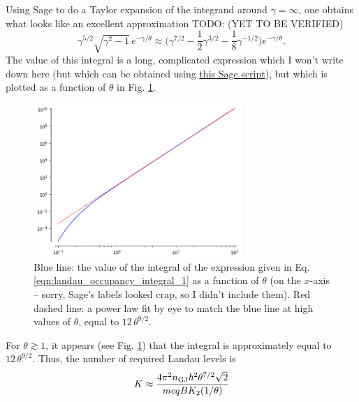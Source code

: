 \documentclass{book}
\newcommand{\todo}[1]{{\color{red}TODO: {#1}}}
\newcommand{\nGJ}{n_{\rm GJ}}
\begin{document}
Using Sage to do a Taylor expansion of the integrand around $\gamma = \infty$, one obtains what looks like an excellent approximation \todo{(YET TO BE VERIFIED)}
\begin{equation}
  \gamma^{5/2}\sqrt{\gamma^2 - 1} \, e^{-\gamma/\theta}
    \approx \bigg( \gamma^{7/2} - \frac12 \gamma^{3/2} - \frac18 \gamma^{-1/2} \bigg) e^{-\gamma/\theta}.
  \label{eqn:landau_occupancy_integral_1}
\end{equation}
The value of this integral is a long, complicated expression which I won't write down here (but which can be obtained using \hyperref[sage:landau_occupancy_integral_1]{this Sage script}), but which is plotted as a function of $\theta$ in Fig. \ref{fig:landau_occupancy_integral_1}.
\begin{figure}[!th]
  \centering
  \includegraphics[width=0.7\textwidth]{images/landau_occupancy_integral_1.png}
  \caption{Blue line: the value of the integral of the expression given in Eq. \eqref{eqn:landau_occupancy_integral_1} as a function of $\theta$ (on the $x$-axis -- sorry, Sage's labels looked crap, so I didn't include them). Red dashed line: a power law fit by eye to match the blue line at high values of $\theta$, equal to $12 \, \theta^{9/2}$.}
  \label{fig:landau_occupancy_integral_1}
\end{figure}
For $\theta \gtrsim 1$, it appears (see Fig. \ref{fig:landau_occupancy_integral_1}) that the integral is approximately equal to $12\,\theta^{9/2}$.
Thus, the number of required Landau levels is
\begin{equation}
  K \approx \frac{4\pi^2 \nGJ \hbar^2 \theta^{7/2} \sqrt{2}}{mcqB K_2(1/\theta)}
\end{equation}
\end{document}
